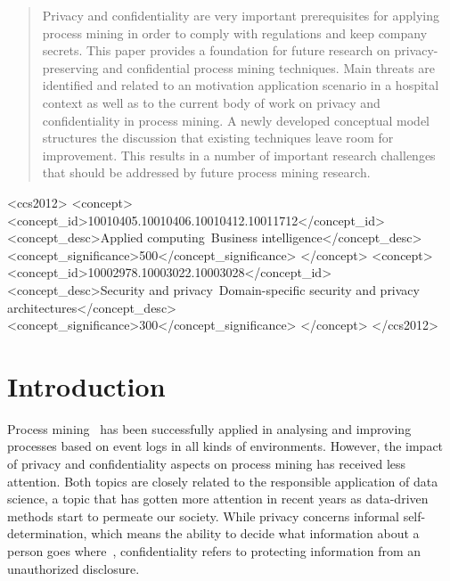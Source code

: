 \documentclass[manuscript]{acmart}
\begin{document}
\begin{abstract}
Privacy and confidentiality are very important prerequisites for applying process mining in order to comply with regulations and keep company secrets. This paper provides a foundation for future research on privacy-preserving and confidential process mining techniques. Main threats are identified and related to an motivation application scenario in a hospital context as well as to the current body of work on privacy and confidentiality in process mining. A newly developed conceptual model structures the discussion that existing techniques leave room for improvement. This results in a number of important research challenges that should be addressed by future process mining research.
\end{abstract}

\begin{CCSXML}
<ccs2012>
<concept>
<concept_id>10010405.10010406.10010412.10011712</concept_id>
<concept_desc>Applied computing~Business intelligence</concept_desc>
<concept_significance>500</concept_significance>
</concept>
<concept>
<concept_id>10002978.10003022.10003028</concept_id>
<concept_desc>Security and privacy~Domain-specific security and privacy architectures</concept_desc>
<concept_significance>300</concept_significance>
</concept>
</ccs2012>
\end{CCSXML}




\maketitle

\section{Introduction}
Process mining~\cite{DBLP:books/sp/Aalst16} has been successfully applied in analysing and improving processes based on event logs in all kinds of environments. However, the impact of privacy and confidentiality aspects on process mining has received less attention. Both topics are closely related to the responsible application of data science, a topic that has gotten more attention in recent years as data-driven methods start to permeate our society. While privacy concerns informal self-determination, which means the ability to decide what information about a person goes where~\cite{W3ORG}, confidentiality refers to protecting information from an unauthorized disclosure.
\end{document}
